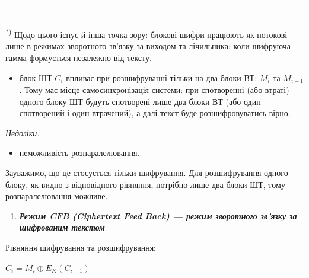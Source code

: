 \_\_\_\_\_\_\_\_\_\_\_\_\_\_\_\_\_\_\_\_\_\_\_\_\_\_\_\_\_\_\_\_\_\_\_\_\_\_\_\_\_\_\_\_\_\_\_\_\_\_\_\_\_\_\_\_\_\_\_\_\_\_\_\_\_\_\_\_\_\_\_\_

\textsuperscript{*) }Щодо цього існує й інша точка зору: блокові шифри працюють
як потокові лише в режимах зворотного зв’язку за виходом та лічильника:  коли
шифруюча гамма  формується незалежно від тексту.

\liststyleWWviiiNumxxvii
\begin{itemize}
\item блок ШТ  $C_i$ впливає  при розшифруванні тільки на два блоки ВТ: 
$M_i$ та  $M_{i+1}$. Тому має місце самосинхронізація системи: при
спотворенні (або втраті) одного блоку ШТ будуть спотворені лише два блоки ВТ
(або один спотворений і один втрачений), а далі текст буде розшифровуватись
вірно.
\end{itemize}

\bigskip

{\itshape
Недоліки:}

\liststyleWWviiiNumxxvii
\begin{itemize}
\item неможливість розпаралелювання.
\end{itemize}
Зауважимо, що це стосується тільки шифрування. Для розшифрування одного блоку,
як видно з відповідного рівняння, потрібно лише два блоки ШТ, тому
розпаралелювання можливе.


\bigskip


\bigskip

\liststyleWWviiiNumxxi
\begin{enumerate}
\item {\centering\bfseries\itshape
Режим CFB (Ciphertext Feed Back) --- режим зворотного зв’язку за шифрованим
текстом
\par}
\end{enumerate}

\bigskip


\bigskip

Рівняння шифрування та розшифрування:

{\centering  $C_{i}=M_{i}{\oplus}E_K(C_{i-1})$\par}


